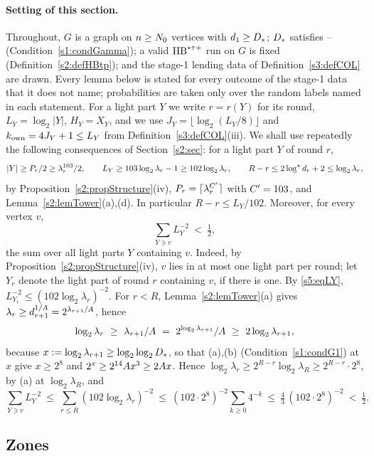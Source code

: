 \paragraph{Setting of this section.} Throughout, $G$ is a graph on $n\ge N_{0}$ vertices with $d_1\ge D_{*}$; $D_{*}$ satisfies -- (Condition~\ref{s1:condGamma}); a valid $\mathrm{HB}^{*\tau{+}}$ run on $G$ is fixed (Definition~\ref{s2:defHBtp}); and the stage-1 lending data of Definition~\ref{s3:defCOL} are drawn. Every lemma below is stated for every outcome of the stage-1 data that it does not name; probabilities are taken only over the random labels named in each statement. For a light part $Y$ we write $r=r(Y)$ for its round, $L_Y=\log_2|Y|$, $H_Y=X_Y$, and we use $J_Y=\lfloor\log_2(L_Y/8)\rfloor$ and $k_{\mathrm{own}}=4J_Y+1\le L_Y$ from Definition~\ref{s3:defCOL}(iii). We shall use repeatedly the following consequences of Section~\ref{s2:sec}: for a light part $Y$ of round $r$,
\begin{equation}\label{s5:eqLY}
|Y|\ge P_r/2\ge\lambda_r^{103}/2,\qquad L_Y\ge 103\log_2\lambda_r-1\ge 102\log_2\lambda_r,\qquad R-r\le 2\log^{\star} d_r+2\le\log_2\lambda_r ,
\end{equation}
by Proposition~\ref{s2:propStructure}(iv), $P_r=\lceil\lambda_r^{C'}\rceil$ with $C'=103$, and Lemma~\ref{s2:lemTower}(a),(d). In particular $R-r\le L_Y/102$. Moreover, for every vertex $v$,
\begin{equation}\label{s5:eqZp}
\sum_{Y\ni v}L_Y^{-2}\ <\ \tfrac12 ,
\end{equation}
the sum over all light parts $Y$ containing $v$. Indeed, by Proposition~\ref{s2:propStructure}(iv), $v$ lies in at most one light part per round; let $Y_r$ denote the light part of round $r$ containing $v$, if there is one. By \eqref{s5:eqLY}, $L_{Y_r}^{-2}\le(102\log_2\lambda_r)^{-2}$. For $r<R$, Lemma~\ref{s2:lemTower}(a) gives $\lambda_r\ge d_{r+1}^{1/A}=2^{\lambda_{r+1}/A}$, hence
\[
\log_2\lambda_r\ \ge\ \lambda_{r+1}/\Aexp\ =\ 2^{\log_2\lambda_{r+1}}/\Aexp\ \ge\ 2\log_2\lambda_{r+1},
\]
because $x\mathrel{:=}\log_2\lambda_{r+1}\ge\log_2\log_2D_{*}$, so that (a),(b) (Condition~\ref{s1:condG1}) at $x$ give $x\ge2^8$ and $2^{x}\ge2^{14}A x^3\ge 2A x$. Hence $\log_2\lambda_r\ge 2^{R-r}\log_2\lambda_R\ge 2^{R-r}\cdot 2^8$, by (a) at $\log_2\lambda_R$, and
\[
\sum_{Y\ni v}L_Y^{-2}\ \le\ \sum_{r\le R}(102\log_2\lambda_r)^{-2}\ \le\ (102\cdot 2^8)^{-2}\sum_{k\ge 0}4^{-k}\ \le\ \tfrac43\,(102\cdot 2^8)^{-2}\ <\ \tfrac12 .
\]

\subsection{Zones}

